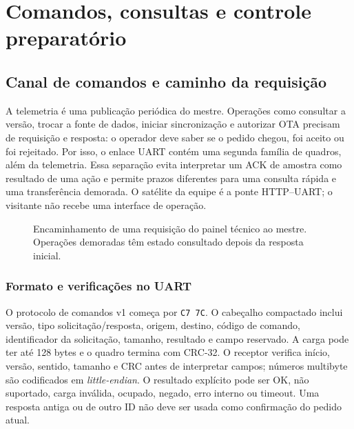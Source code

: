 \chapter{Comandos, consultas e controle preparatório}\label{cap:comandos}
\section{Canal de comandos e caminho da requisição}
A telemetria é uma publicação periódica do mestre. Operações como consultar a versão, trocar a fonte de dados, iniciar sincronização e autorizar OTA precisam de requisição e resposta: o operador deve saber se o pedido chegou, foi aceito ou foi rejeitado. Por isso, o enlace UART contém uma segunda família de quadros, além da telemetria. Essa separação evita interpretar um ACK de amostra como resultado de uma ação e permite prazos diferentes para uma consulta rápida e uma transferência demorada. O satélite da equipe é a ponte HTTP--UART; o visitante não recebe uma interface de operação.

\begin{figure}[htbp]\centering
{}
\caption{Encaminhamento de uma requisição do painel técnico ao mestre. Operações demoradas têm estado consultado depois da resposta inicial.}\label{fig:comando}
\end{figure}

\subsection{Formato e verificações no UART}
O protocolo de comandos v1 começa por \texttt{C7 7C}. O cabeçalho compactado inclui versão, tipo solicitação/resposta, origem, destino, código de comando, identificador da solicitação, tamanho, resultado e campo reservado. A carga pode ter até 128 bytes e o quadro termina com CRC-32. O receptor verifica início, versão, sentido, tamanho e CRC antes de interpretar campos; números multibyte são codificados em \emph{little-endian}. O resultado explícito pode ser OK, não suportado, carga inválida, ocupado, negado, erro interno ou timeout. Uma resposta antiga ou de outro ID não deve ser usada como confirmação do pedido atual.

